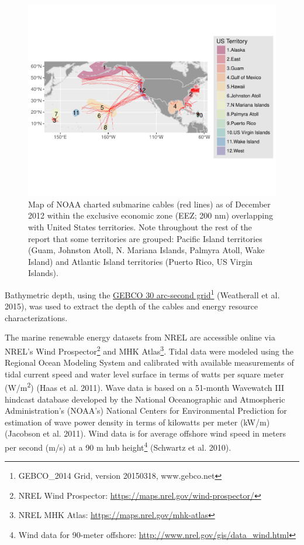 \documentclass[]{article}
\let\rmarkdownfootnote\footnote%
\def\footnote{\protect\rmarkdownfootnote}
\begin{document}
\begin{figure}
\includegraphics[width=6.5in]{figs/mapCableTerritories} \caption{Map of NOAA charted submarine cables (red lines) as of December 2012 within the exclusive economic zone (EEZ; 200 nm) overlapping with United States territories. Note throughout the rest of the report that some territories are grouped: Pacific Island territories (Guam, Johnston Atoll, N. Mariana Islands, Palmyra Atoll, Wake Island) and Atlantic Island territories (Puerto Rico, US Virgin Islands).}\label{fig:mapCableTerritories}
\end{figure}

Bathymetric depth, using the
\href{http://www.gebco.net/data_and_products/gridded_bathymetry_data/gebco_30_second_grid/}{GEBCO
30 arc-second grid}\footnote{GEBCO\_2014 Grid, version 20150318,
  www.gebco.net} (Weatherall et al. 2015), was used to extract the depth
of the cables and energy resource characterizations.

The marine renewable energy datasets from NREL are accessible online via
NREL's Wind Prospector\footnote{NREL Wind Prospector:
  \url{https://maps.nrel.gov/wind-prospector/}} and MHK Atlas\footnote{NREL
  MHK Atlas: \url{https://maps.nrel.gov/mhk-atlas}}. Tidal data were
modeled using the Regional Ocean Modeling System and calibrated with
available measurements of tidal current speed and water level surface in
terms of watts per square meter (W/m\textsuperscript{2}) (Haas et al.
2011). Wave data is based on a 51-month Wavewatch III hindcast database
developed by the National Oceanographic and Atmospheric Administration's
(NOAA's) National Centers for Environmental Prediction for estimation of
wave power density in terms of kilowatts per meter (kW/m) (Jacobson et
al. 2011). Wind data is for average offshore wind speed in meters per
second (m/s) at a 90 m hub height\footnote{Wind data for 90-meter
  offshore: \url{http://www.nrel.gov/gis/data_wind.html}} (Schwartz et
al. 2010).
\end{document}
